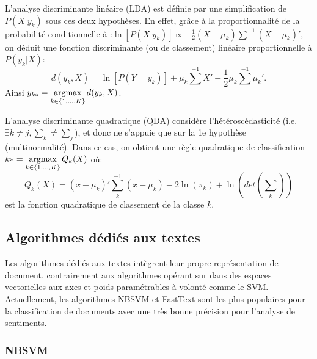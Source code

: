 L'analyse discriminante linéaire (LDA) est définie par une simplification de $P(X \vert y_k)$ sous ces deux hypothèses. En effet, grâce à la proportionnalité de la probabilité conditionnelle à :$\ln\left[P(X \vert y_k)\right] \propto -\frac{1}{2}( X - \mu_k )\sum^{-1}(X - \mu_k )'$, on déduit une fonction discriminante (ou de classement) linéaire proportionnelle à $P(y_k \vert X)$: \[d(y_k, X) = \ln\left[P(Y = y_k)\right] + \mu_k \sum^{-1}X' - \frac{1}{2}\mu_k\sum^{-1}\mu_k'.\] Ainsi $y_{k*} = \mathop{\mathrm{argmax}}\limits_{k \in \lbrace 1,...,K \rbrace} d(y_k, X)$.

L'analyse discriminante quadratique (QDA) considère l'hétéroscédasticité (i.e. $\exists k \neq j, \sum_k \neq \sum_j$), et donc ne s'appuie que sur la 1e hypothèse (multinormalité). Dans ce cas, on obtient une règle quadratique de classification $k* = \mathop{\mathrm{argmax}}\limits_{k \in \lbrace 1,...,K \rbrace} Q_k(X)$ où:
\[Q_k(X) = (x - \mu_k)'\sum_k^{-1}(x - \mu_k) - 2 \ln(\pi_k) + \ln(det(\sum_k))\] est la fonction quadratique de classement de la classe $k$.



\subsection{Algorithmes dédiés aux textes}
Les algorithmes dédiés aux textes intègrent leur propre représentation de document, contrairement aux algorithmes opérant sur dans des espaces vectorielles aux axes et poids paramétrables à volonté comme le SVM.  Actuellement, les algorithmes NBSVM \citep{wang2012nbsvm} et FastText \citep{grave2017fasttextcls} sont les plus populaires pour la classification de documents avec une très bonne précision pour l'analyse de sentiments. 


\subsubsection{NBSVM}

